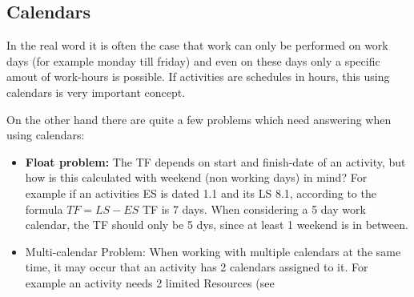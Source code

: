 \subsection{Calendars}

In the real word it is often the case that work can only be performed on work days (for example monday till friday) and even on these days only a specific amout of work-hours is possible. If activities are schedules in hours, this using calendars is very important concept.

On the other hand there are quite a few problems which need answering when using calendars:
\begin{itemize}
	\item \textbf{Float problem:} The TF depends on start and finish-date of an activity, but how is this calculated with weekend (non working days) in mind? For example if an activities ES is dated 1.1 and its LS 8.1, according to the formula $TF = LS - ES $ TF is 7 days. When considering a 5 day work calendar, the TF should only be 5 dys, since at least 1 weekend is in between. 
	\item Multi-calendar Problem: When working with multiple calendars at the same time, it may occur that an activity has 2 calendars assigned to it. For example an activity needs 2 limited Resources (see 
	
\end{itemize}



